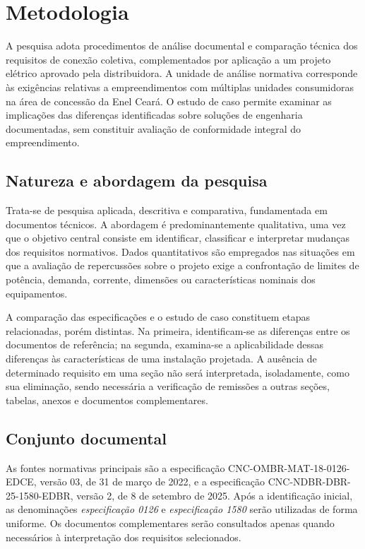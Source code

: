 \chapter{Metodologia}
\label{cap:metodologia}

A pesquisa adota procedimentos de análise documental e comparação técnica dos requisitos de conexão coletiva, complementados por aplicação a um projeto elétrico aprovado pela distribuidora. A unidade de análise normativa corresponde às exigências relativas a empreendimentos com múltiplas unidades consumidoras na área de concessão da Enel Ceará. O estudo de caso permite examinar as implicações das diferenças identificadas sobre soluções de engenharia documentadas, sem constituir avaliação de conformidade integral do empreendimento.

\section{Natureza e abordagem da pesquisa}
\label{sec:tipo-pesquisa}

Trata-se de pesquisa aplicada, descritiva e comparativa, fundamentada em documentos técnicos. A abordagem é predominantemente qualitativa, uma vez que o objetivo central consiste em identificar, classificar e interpretar mudanças dos requisitos normativos. Dados quantitativos são empregados nas situações em que a avaliação de repercussões sobre o projeto exige a confrontação de limites de potência, demanda, corrente, dimensões ou características nominais dos equipamentos.

A comparação das especificações e o estudo de caso constituem etapas relacionadas, porém distintas. Na primeira, identificam-se as diferenças entre os documentos de referência; na segunda, examina-se a aplicabilidade dessas diferenças às características de uma instalação projetada. A ausência de determinado requisito em uma seção não será interpretada, isoladamente, como sua eliminação, sendo necessária a verificação de remissões a outras seções, tabelas, anexos e documentos complementares.

\section{Conjunto documental}
\label{sec:documentos}

As fontes normativas principais são a especificação CNC-OMBR-MAT-18-0126-EDCE, versão 03, de 31 de março de 2022, e a especificação CNC-NDBR-DBR-25-1580-EDBR, versão 2, de 8 de setembro de 2025. Após a identificação inicial, as denominações \emph{especificação 0126} e \emph{especificação 1580} serão utilizadas de forma uniforme. Os documentos complementares serão consultados apenas quando necessários à interpretação dos requisitos selecionados.

